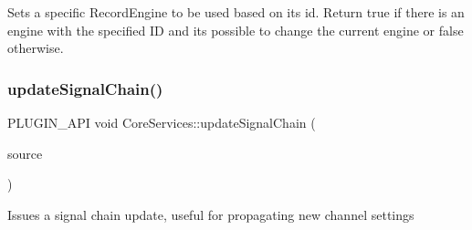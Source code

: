 Sets a specific Record\+Engine to be used based on its id. Return true if there is an engine with the specified ID and it\textquotesingle{}s possible to change the current engine or false otherwise. \mbox{\label{namespace_core_services_a2e53c32783c6caa3d66afb7172dc61fd}} 
\subsubsection{\texorpdfstring{update\+Signal\+Chain()}{updateSignalChain()}}
{\footnotesize\ttfamily P\+L\+U\+G\+I\+N\+\_\+\+A\+PI void Core\+Services\+::update\+Signal\+Chain (\begin{DoxyParamCaption}\item[{Generic\+Editor $\ast$}]{source }\end{DoxyParamCaption})}

Issues a signal chain update, useful for propagating new channel settings 